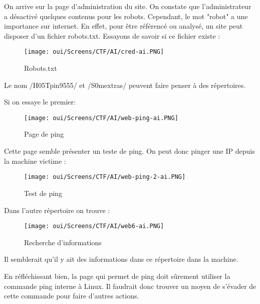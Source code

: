 \noindent On arrive sur la page d'administration du site. On constate que l'administrateur a désactivé quelques contenus pour les robots. Cependant, le mot "robot" a une importance sur internet. 
En effet, pour être référencé ou analysé, un site peut disposer d'un fichier robots.txt. Essayons de savoir si ce fichier existe :

\begin{figure}[htp!]
  \centering
  \setlength\figureheight{7cm}
  \setlength\figurewidth{9cm}
  \texttt{[image: oui/Screens/CTF/AI/cred-ai.PNG]}     
  \caption{Robots.txt}
  \label{fig:courbe-tikz}
\end{figure}

\noindent Le nom /H05Tpin9555/ et /S0mextras/ peuvent faire penser à des répertoires.

\newpage 
\noindent Si on essaye le premier:

\begin{figure}[htp!]
  \centering
  \setlength\figureheight{7cm}
  \setlength\figurewidth{9cm}
  \texttt{[image: oui/Screens/CTF/AI/web-ping-ai.PNG]}   
  \caption{Page de ping}
  \label{fig:courbe-tikz}
\end{figure}

\noindent Cette page semble présenter un teste de ping. On peut donc pinger une IP depuis la machine victime :

\begin{figure}[htp!]
  \centering
  \setlength\figureheight{7cm}
  \setlength\figurewidth{9cm}
  \texttt{[image: oui/Screens/CTF/AI/web-ping-2-ai.PNG]}   
  \caption{Test de ping}
  \label{fig:courbe-tikz}
\end{figure}

\newpage
\noindent Dans l'autre répertoire on trouve :

\begin{figure}[htp!]
  \centering
  \setlength\figureheight{7cm}
  \setlength\figurewidth{9cm}
  \texttt{[image: oui/Screens/CTF/AI/web6-ai.PNG]}   
  \caption{Recherche d'informations}
  \label{fig:courbe-tikz}
\end{figure}

\noindent Il semblerait qu'il y ait des informations dans ce répertoire dans la machine.

\noindent En réfléchissant bien, la page qui permet de ping doit sûrement utiliser la commande ping interne à Linux. Il faudrait donc trouver un moyen de s'évader de cette commande pour faire d'autres actions.

